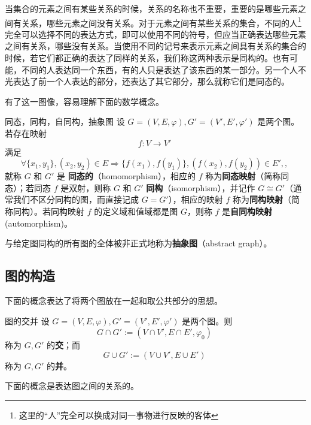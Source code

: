 当集合的元素之间有某些关系的时候，关系的名称也不重要，重要的是哪些元素之间有关系，哪些元素之间没有关系。对于元素之间有某些关系的集合，不同的人\footnote{这里的“人”完全可以换成对同一事物进行反映的客体}完全可以选择不同的表达方式，即可以使用不同的符号，但应当正确表达哪些元素之间有关系，哪些没有关系。当使用不同的记号来表示元素之间具有关系的集合的时候，若它们都正确的表达了同样的关系，我们称这两种表示是同构的。也有可能，不同的人表达同一个东西，有的人只是表达了该东西的某一部分。另一个人不光表达了前一个人表达的部分，还表达了其它部分，那么就称它们是同态的。

有了这一图像，容易理解下面的数学概念。
\begin{definition}{同态，同构，自同构，抽象图}
设 $G=(V,E,\varphi),G'=(V',E',\varphi')$ 是两个图。若存在映射
\begin{equation}
f:V\rightarrow V'~
\end{equation}
满足
\begin{equation}
\forall\{x_1,y_1\},(x_2,y_2)\in E\Rightarrow \{f(x_1),f(y_1)\},(f(x_2),f(y_2))\in E',,~
\end{equation}
就称 $G$ 和 $G'$ 是 \textbf{同态的}（homomorphism），相应的 $f$ 称为\textbf{同态映射}（简称同态）；若同态 $f$ 是双射，则称 $G$ 和 $G'$ \textbf{同构}（isomorphism），并记作 $G\cong G'$（通常我们不区分同构的图，而直接记成 $G=G'$），相应的映射 $f$ 称为\textbf{同构映射}（简称同构）。若同构映射 $f$ 的定义域和值域都是图 $G$，则称 $f$ 是\textbf{自同构映射}(automorphism)。

与给定图同构的所有图的全体被非正式地称为\textbf{抽象图}（abstract graph）。
\end{definition}


\subsection{图的构造}
下面的概念表达了将两个图放在一起和取公共部分的思想。

\begin{definition}{图的交并}
设 $G=(V,E,\varphi),G'=(V',E',\varphi')$ 是两个图。则
\begin{equation}
G\cap G':=(V\cap V',E\cap E',\varphi_0)~
\end{equation}
称为 $G,G'$ 的\textbf{交}；而
\begin{equation}
G\cup G':=(V\cup V',E\cup E')~
\end{equation}
称为 $G,G'$ 的\textbf{并}。
\end{definition}

下面的概念是表达图之间的关系的。

